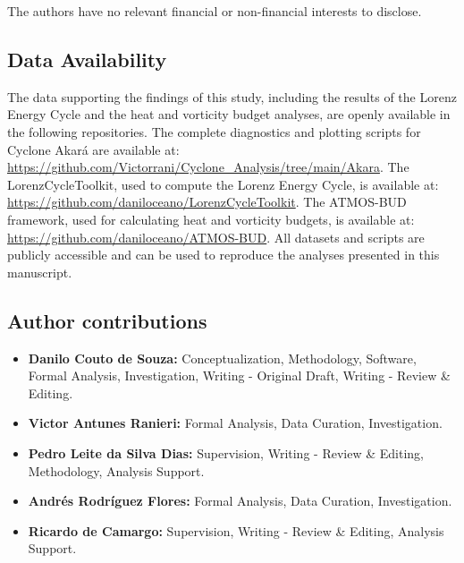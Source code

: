 \documentclass[pdflatex,sn-chicago]{sn-jnl}%
\theoremstyle{plain}
\theoremstyle{definition}
\theoremstyle{remark}
\theoremstyle{definition}
\begin{document}
The authors have no relevant financial or non-financial interests to disclose.

\subsection*{Data Availability}

The data supporting the findings of this study, including the results of the Lorenz Energy Cycle and the heat and vorticity budget analyses, are openly available in the following repositories. The complete diagnostics and plotting scripts for Cyclone Akará are available at: \url{https://github.com/Victorrani/Cyclone_Analysis/tree/main/Akara}. The LorenzCycleToolkit, used to compute the Lorenz Energy Cycle, is available at: \url{https://github.com/daniloceano/LorenzCycleToolkit}. The ATMOS-BUD framework, used for calculating heat and vorticity budgets, is available at: \url{https://github.com/daniloceano/ATMOS-BUD}. All datasets and scripts are publicly accessible and can be used to reproduce the analyses presented in this manuscript.

\subsection*{Author contributions}

\begin{itemize} \item \textbf{Danilo Couto de Souza:} Conceptualization, Methodology, Software, Formal Analysis, Investigation, Writing - Original Draft, Writing - Review \& Editing. \item \textbf{Victor Antunes Ranieri:} Formal Analysis, Data Curation, Investigation.  \item \textbf{Pedro Leite da Silva Dias:} Supervision, Writing - Review \& Editing, Methodology, Analysis Support. \item \textbf{Andrés Rodríguez Flores:} Formal Analysis, Data Curation, Investigation. \item \textbf{Ricardo de Camargo:} Supervision, Writing - Review \& Editing, Analysis Support. \end{itemize}

\end{document}
